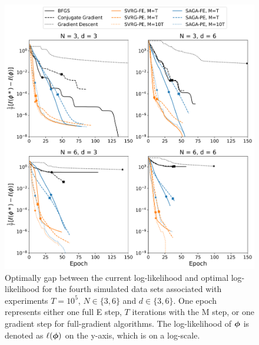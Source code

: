 \documentclass[12pt]{article}
\begin{document}
\begin{figure}[H]
    \centering
    \includegraphics[width=6.5in]{../plt/log-like_v_epoch_T-100000-003.png}
    \caption{Optimally gap between the current log-likelihood and optimal log-likelihood for the fourth simulated data sets associated with experiments $T=10^{5}$, $N \in \{3,6\}$ and $d \in \{3,6\}$. One epoch represents either one full E step, $T$ iterations with the M step, or one gradient step for full-gradient algorithms. The log-likelihood of $\boldsymbol{\phi}$ is denoted as $\ell(\boldsymbol{\phi})$ on the y-axis, which is on a log-scale.}
\end{figure}
%
\end{document}
